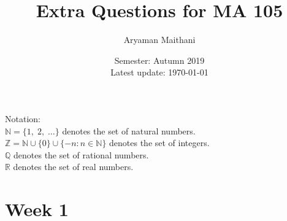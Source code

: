 \documentclass{article}
\title{Extra Questions for MA 105}
\author{Aryaman Maithani}
\date{Semester: Autumn 2019\\ Latest update: \today}
\begin{document}
\maketitle
\hrulefill

Notation:\\
$\mathbb{N} = \{1,\; 2,\; \ldots\}$ denotes the set of natural numbers.\\
$\mathbb{Z} = \mathbb{N} \cup \{0\} \cup \{-n : n\in\mathbb{N}\}$ denotes the set of integers.\\
$\mathbb{Q}$ denotes the set of rational numbers.\\
$\mathbb{R}$ denotes the set of real numbers.\\
\section{Week 1}
\end{document}
